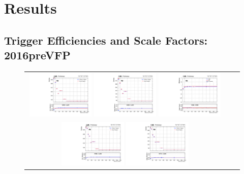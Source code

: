 \newpage
\section{Results}

\subsection{Trigger Efficiencies and Scale Factors: 2016preVFP}
\label{TrigSFResults2016preVFP}

\begin{figure}[h]
  \begin{center}
    \begin{tabular}{ccc}
      \includegraphics[width=0.32\textwidth]{fig_2016preVFP_TrigSF/g_lepApt_emu_MC.pdf}
      \includegraphics[width=0.32\textwidth]{fig_2016preVFP_TrigSF/g_lepApt_emu_data.pdf}
      \includegraphics[width=0.32\textwidth]{fig_2016preVFP_TrigSF/g_emu_lepApt_FullSystUncBand.pdf}\\
      \includegraphics[width=0.32\textwidth]{fig_2016preVFP_TrigSF/g_lepBpt_emu_MC.pdf}
      \includegraphics[width=0.32\textwidth]{fig_2016preVFP_TrigSF/g_lepBpt_emu_data.pdf}

\end{tabular}
\end{center}
\end{figure}
